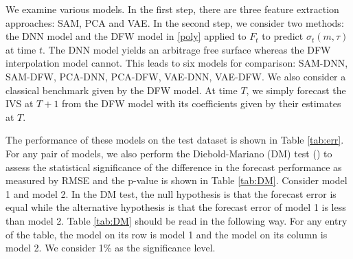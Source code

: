 \documentclass[11pt,a4paper]{article}
\theoremstyle{remark}
\begin{document}
We examine various models. In the first step, there are three feature extraction approaches: SAM, PCA and VAE. In the second step, we consider two methods: the DNN model and the DFW model in \eqref{poly} applied to $F_t$ to predict $\sigma_t(m,\tau)$ at time $t$. The DNN model yields an arbitrage free surface whereas the DFW interpolation model cannot. This leads to six models for comparison: SAM-DNN, SAM-DFW, PCA-DNN, PCA-DFW, VAE-DNN, VAE-DFW. We also consider a classical benchmark given by the DFW model. At time $T$, we simply forecast the IVS at $T+1$ from the DFW model with its coefficients given by their estimates at $T$. 


The performance of these models on the test dataset is shown in Table \ref{tab:err}. For any pair of models, we also perform the Diebold-Mariano (DM) test (\cite{diebold2002comparing}) to assess the statistical significance of the difference in the forecast performance as measured by RMSE and the p-value is shown in Table \ref{tab:DM}. Consider model 1 and model 2. In the DM test, the null hypothesis is that the forecast error is equal while the alternative hypothesis is that the forecast error of model 1 is less than model 2. Table \ref{tab:DM} should be read in the following way. For any entry of the table, the model on its row is model 1 and the model on its column is model 2. We consider 1\% as the significance level.
\end{document}
